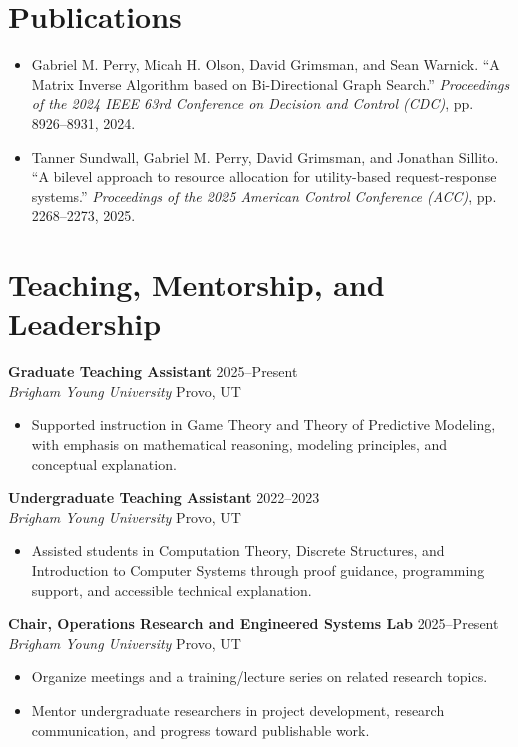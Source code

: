 \documentclass[10pt,letterpaper]{article}
\newcommand{\entry}[4]{%
  \textbf{#1} \hfill {\color{muted}#2}\\
  \emph{#3} \hfill {\color{muted}#4}\\[-0.2em]
}
\begin{document}
\section{Publications}
\begin{itemize}
    \item Gabriel M. Perry, Micah H. Olson, David Grimsman, and Sean Warnick. ``A Matrix Inverse Algorithm based on Bi-Directional Graph Search.'' \emph{Proceedings of the 2024 IEEE 63rd Conference on Decision and Control (CDC)}, pp. 8926--8931, 2024.
    \item Tanner Sundwall, Gabriel M. Perry, David Grimsman, and Jonathan Sillito. ``A bilevel approach to resource allocation for utility-based request-response systems.'' \emph{Proceedings of the 2025 American Control Conference (ACC)}, pp. 2268--2273, 2025.
\end{itemize}

\section{Teaching, Mentorship, and Leadership}
\entry{Graduate Teaching Assistant}{2025--Present}{Brigham Young University}{Provo, UT}
\begin{itemize}
    \item Supported instruction in Game Theory and Theory of Predictive Modeling, with emphasis on mathematical reasoning, modeling principles, and conceptual explanation.
\end{itemize}

\entry{Undergraduate Teaching Assistant}{2022--2023}{Brigham Young University}{Provo, UT}
\begin{itemize}
    \item Assisted students in Computation Theory, Discrete Structures, and Introduction to Computer Systems through proof guidance, programming support, and accessible technical explanation.
\end{itemize}

\entry{Chair, Operations Research and Engineered Systems Lab}{2025--Present}{Brigham Young University}{Provo, UT}
\begin{itemize}
    \item Organize meetings and a training/lecture series on related research topics.
    \item Mentor undergraduate researchers in project development, research communication, and progress toward publishable work.
\end{itemize}
\end{document}
